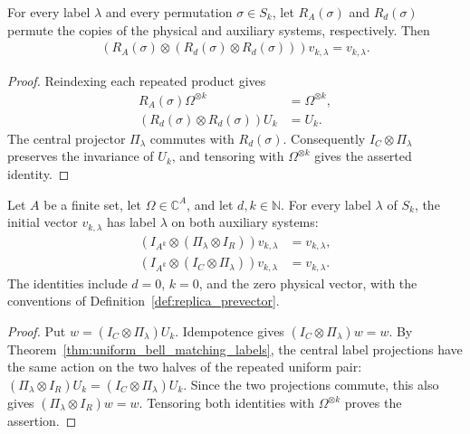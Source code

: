\begin{theorem}
    \label{thm:replica_prevector_symmetry}
    \leanok
    For every label $\lambda$ and every permutation $\sigma\in S_k$, let
    $R_A(\sigma)$ and $R_d(\sigma)$ permute the copies of the physical and
    auxiliary systems, respectively. Then
    \begin{align}
        (R_A(\sigma)\otimes(R_d(\sigma)\otimes R_d(\sigma)))v_{k,\lambda}
        =v_{k,\lambda}.
    \end{align}
\end{theorem}
\begin{proof}
    \leanok
    Reindexing each repeated product gives
    \begin{align}
        R_A(\sigma)\Omega^{\otimes k}       & =\Omega^{\otimes k}, \\
        (R_d(\sigma)\otimes R_d(\sigma))U_k & =U_k.
    \end{align}
    The central projector $\Pi_\lambda$ commutes with $R_d(\sigma)$.
    Consequently $I_C\otimes\Pi_\lambda$ preserves the invariance of $U_k$,
    and tensoring with $\Omega^{\otimes k}$ gives the asserted identity.
\end{proof}

\begin{theorem}
    \label{thm:replica_prevector_auxiliary_labels}
    \leanok
    Let $A$ be a finite set, let $\Omega\in\mathbb C^A$, and let
    $d,k\in\mathbb N$. For every label $\lambda$ of $S_k$, the initial
    vector $v_{k,\lambda}$ has label $\lambda$ on both auxiliary systems:
    \begin{align}
        (I_{A^k}\otimes(\Pi_\lambda\otimes I_R))v_{k,\lambda}
         & =v_{k,\lambda}, \\
        (I_{A^k}\otimes(I_C\otimes\Pi_\lambda))v_{k,\lambda}
         & =v_{k,\lambda}.
    \end{align}
    The identities include $d=0$, $k=0$, and the zero physical vector,
    with the conventions of Definition~\ref{def:replica_prevector}.
\end{theorem}
\begin{proof}
    \leanok
    Put $w=(I_C\otimes\Pi_\lambda)U_k$. Idempotence gives
    $(I_C\otimes\Pi_\lambda)w=w$. By Theorem~\ref{thm:uniform_bell_matching_labels}, the central label
    projections have the same action on the two halves of the repeated uniform pair:
    $(\Pi_\lambda\otimes I_R)U_k=(I_C\otimes\Pi_\lambda)U_k$.
    Since the two projections commute, this also gives
    $(\Pi_\lambda\otimes I_R)w=w$. Tensoring both identities with
    $\Omega^{\otimes k}$ proves the assertion.
\end{proof}
